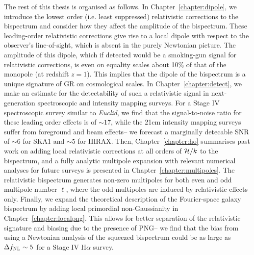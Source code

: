 The rest of this thesis is organised as follows. In Chapter~\ref{chapter:dipole}, we introduce the lowest order (i.e. least suppressed) relativistic corrections to the bispectrum and consider how they affect the amplitude of the bispectrum. These leading-order relativistic corrections give rise to a local dipole with respect to the observer's line-of-sight, which is absent in the purely Newtonian picture. The amplitude of this dipole, which if detected would be a smoking-gun signal for relativistic corrections, is even on equality scales about 10\% of that of the monopole (at redshift $z = 1$). This implies that the dipole of the bispectrum is a unique signature of GR on cosmological scales. In Chapter~\ref{chapter:detect}, we make an estimate for the detectability of such a relativistic signal in next-generation spectroscopic and intensity mapping surveys. For a Stage IV spectroscopic survey similar to \textit{Euclid}, we find that the signal-to-noise ratio for these leading order effects is of $\sim 17$, while the 21cm intensity mapping surveys suffer from foreground and beam effects-- we forecast a marginally detecable SNR of $\sim 6$ for SKA1 and $\sim 5$ for HIRAX. Then, Chapter~\ref{chapter:ho} summarises past work on adding local relativistic corrections at all orders of $\mathcal{H}/k$ to the bispectrum, and a fully analytic multipole expansion with relevant numerical analyses for future surveys is presented in Chapter~\ref{chapter:multipoles}. The relativistic bispectrum generates non-zero multipoles for both even and odd multipole number $\ell$, where the odd multipoles are induced by relativistic effects only. Finally, we expand the theoretical description of the Fourier-space galaxy bispectrum by adding local primordial non-Gaussianity in Chapter~\ref{chapter:localpng}. This allows for better separation of the relativistic signature and biasing due to the presence of PNG-- we find that the bias from using a Newtonian analysis of the squeezed bispectrum could be as large as $\Delta f_{\mathrm{NL}} \sim 5$ for a Stage IV H$\alpha$ survey. 